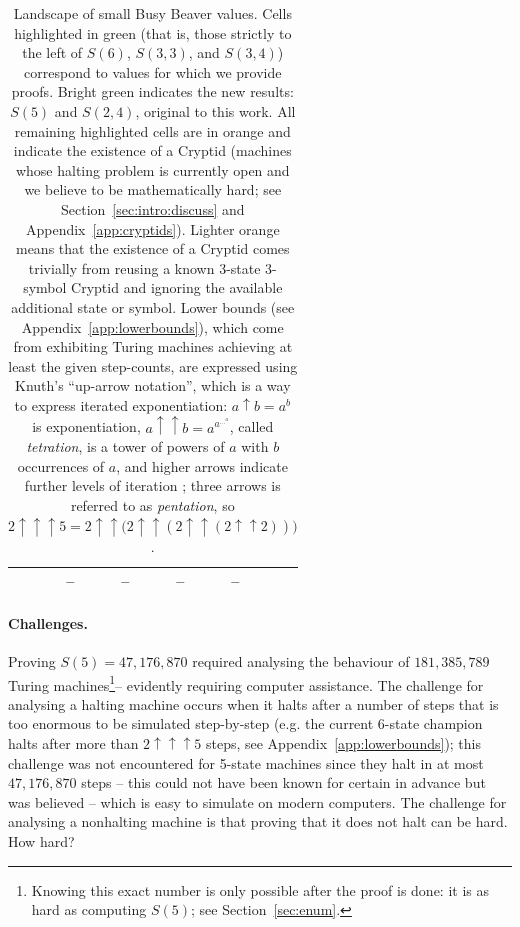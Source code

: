 \documentclass[a4paper,british]{article}
\theoremstyle{definition} %
\numberwithin{equation}{section}
\theoremstyle{definition} %
\newcommand{\BBtheFifth}{47{,}176{,}870}
\newcommand{\BBtheFifthTNF}{181{,}385{,}789}
\begin{document}
\begin{table}[h]
\begin{tabular}{c|ccccc}
                         & --                                                                         & --               & --               & --                                  \\
        \hline
    \end{tabular}
    \caption{Landscape of small Busy Beaver values.
        Cells highlighted in green (that is, those strictly to the left of $S(6)$, $S(3,3)$, and $S(3,4)$) correspond to values for which we provide \Coq proofs. Bright green indicates the new results: $S(5)$ and $S(2,4)$, original to this work.
        All remaining highlighted cells are in orange and indicate the existence of a Cryptid (\ie machines whose halting problem is currently open and we believe to be mathematically hard; see Section~\ref{sec:intro:discuss} and Appendix~\ref{app:cryptids}). Lighter orange means that the existence of a Cryptid comes trivially from reusing a known 3-state 3-symbol Cryptid and ignoring the available additional state or symbol. Lower bounds (see Appendix~\ref{app:lowerbounds}), which come from exhibiting Turing machines achieving at least the given step-counts, are expressed using Knuth's ``up-arrow notation'', which is a way to express iterated exponentiation:
        $a \uparrow b = a^b$ is exponentiation,
        $a \uparrow\uparrow b = a^{a^{\dots^a}}$, called \textit{tetration}, is a tower of powers of $a$ with $b$ occurrences of $a$,
        and higher arrows indicate further levels of iteration \cite{Knuth1976Coping}; \eg three arrows is referred to as \textit{pentation}, so $2 \uparrow \uparrow \uparrow 5 = 2 \uparrow\uparrow \bigl( 2 \uparrow\uparrow ( 2 \uparrow\uparrow ( 2 \uparrow\uparrow 2 ) ) \bigr)$.
    }
    \label{table:landscape}
\end{table}

\vspace{-2ex}
\paragraph{Challenges.} Proving $S(5) = \BBtheFifth$ required analysing the behaviour of $\BBtheFifthTNF$ Turing machines\footnote{Knowing this exact number is only possible after the proof is done: it is as hard as computing $S(5)$; see Section~\ref{sec:enum}.}-- evidently requiring computer assistance. The challenge for analysing a halting machine occurs when it halts after a number of steps that is too enormous to be simulated step-by-step (e.g. the current 6-state champion halts after more than $2 \uparrow \uparrow \uparrow 5$ steps, see Appendix~\ref{app:lowerbounds}); this challenge was not encountered for 5-state machines since they halt in at most $\BBtheFifth$ steps -- this could not have been known for certain in advance but was believed -- which is easy to simulate on modern computers. The challenge for analysing a nonhalting machine is that proving that it does not halt can be hard. How hard?
\end{document}
